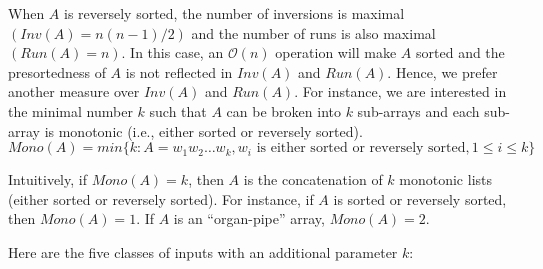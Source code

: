 \documentclass[AMA,STIX1COL]{WileyNJD-v2}
\begin{document}
When $A$ is reversely sorted, the number of inversions is maximal $(Inv(A) = n(n - 1)/2)$ and the number of runs is also maximal $(Run(A) = n)$. 
In this case, an $\mathcal{O}(n)$ operation will make $A$ sorted and the presortedness of $A$ is not reflected in $Inv(A)$ and $Run(A)$. 
Hence, we prefer another measure over $Inv(A)$ and $Run(A)$. 
For instance, we are interested in the minimal number $k$ such that $A$ can be broken into $k$ sub-arrays and each sub-array is monotonic (i.e., either sorted or reversely sorted).    
\[ Mono(A) = min\{ k : A =  w_1 w_2 … w_k, w_i  \text { is either sorted or reversely sorted},1 \leq i \le k\} \]
           
Intuitively, if $Mono(A) = k$, then $A$ is the concatenation of $k$ monotonic lists (either sorted or reversely sorted). 
For instance, if $A$ is sorted or reversely sorted, then $Mono(A) = 1$. 
If $A$ is an ``organ-pipe” array, $Mono(A) = 2$.     

Here are the five classes of inputs with an additional parameter $k$:
\end{document}
